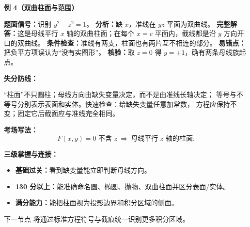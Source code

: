 \begin{knowledgeBox}
\textbf{例 4（双曲柱面与范围）}

\textbf{题面信号：}识别 \(y^2-z^2=1\)。
\textbf{分析：}缺 \(x\)，准线在 \(yz\) 平面为双曲线。
\textbf{完整解答：}这是母线平行 \(x\) 轴的双曲柱面；在每个
\(x=c\) 平面内，截线都是沿 \(y\) 方向开口的双曲线。
\textbf{条件检查：}准线有两支，柱面也有两片互不相连的部分。
\textbf{易错点：}把负平方项误认为“没有实图形”。
\textbf{核验：}取 \(z=0\) 得 \(y=\pm1\)，确有两条母线族起点。

\textbf{失分防线：}

“柱面”不只圆柱；母线方向由缺失变量决定，而不是由准线长轴决定；
等号与不等号分别表示表面和实体。快速检查：给缺失变量任意加常数，
方程应保持不变；固定它后截面应与准线完全相同。

\textbf{考场写法：}
\[
\boxed{F(x,y)=0\text{ 不含 }z
\ \Longrightarrow\ \text{母线平行 }z\text{ 轴的柱面}.}
\]

\textbf{三级掌握与连接：}
\begin{itemize}
  \item \textbf{基础过关：}看到缺变量能立即判断母线方向。
  \item \textbf{130 分以上：}能准确命名圆、椭圆、抛物、双曲柱面并区分表面/实体。
  \item \textbf{满分能力：}能把柱面视为投影边界和积分区域的侧面。
\end{itemize}
下一节点 
将通过标准方程符号与截痕统一识别更多积分区域。
\end{knowledgeBox}


\par

